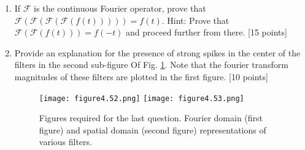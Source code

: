 \documentclass[11pt]{article}
\begin{document}
\begin{enumerate}
\item If $\mathcal{F}$ is the continuous Fourier operator, prove that $\mathcal{F}(\mathcal{F}(\mathcal{F}(\mathcal{F}(f(t))))) = f(t)$. Hint: Prove that $\mathcal{F}(\mathcal{F}(f(t))) = f(-t)$ and proceed further from there. \textsf{[15 points]}

\item Provide an explanation for the presence of strong spikes in the center of the filters in the second sub-figure Of Fig. \ref{fig:ff}. Note that the fourier transform magnitudes of these filters are plotted in the first figure. \textsf{[10 points]}
\begin{figure}
    \texttt{[image: figure4.52.png]}
    \texttt{[image: figure4.53.png]}
\caption{Figures required for the last question. Fourier domain (first figure) and spatial domain (second figure) representations of various filters.}
\label{fig:ff}
\end{figure}

\end{enumerate}
\end{document}
